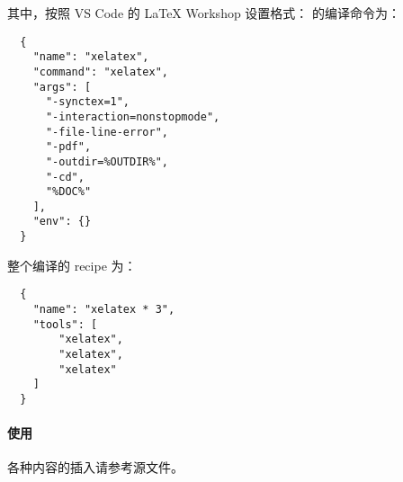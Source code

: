 其中，按照 VS Code 的 LaTeX Workshop 设置格式：{} 的编译命令为：

\begin{verbatim}
  {
    "name": "xelatex",
    "command": "xelatex",
    "args": [
      "-synctex=1",
      "-interaction=nonstopmode",
      "-file-line-error",
      "-pdf",
      "-outdir=%OUTDIR%",
      "-cd",
      "%DOC%"
    ],
    "env": {}
  }
\end{verbatim}

整个编译的 recipe 为：

\begin{verbatim}
  {
    "name": "xelatex * 3",
    "tools": [
        "xelatex",
        "xelatex",
        "xelatex"
    ]
  }
\end{verbatim}

\paragraph{使用}

各种内容的插入请参考源文件。

